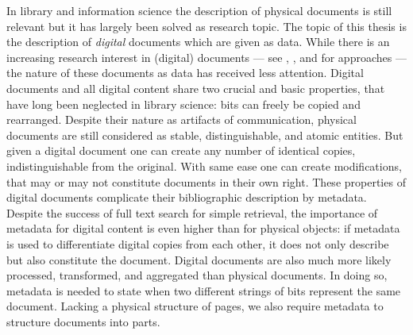 In library and information science the description of physical documents is
still relevant but it has largely been solved as research topic. The topic of
this thesis is the description of \emph{digital} documents which are given as
data.  While there is an increasing research interest in (digital) documents
--- see \textcite{Buckland1998}, \textcite{Pedauque2006}, and
\textcite{Skare2007} for approaches --- the nature of these documents as data
has received less attention. Digital documents and all digital content share
two crucial and basic properties, that have long been neglected in library
science: bits can freely be copied and rearranged.  Despite their nature as
artifacts of communication, physical documents are still considered as stable,
distinguishable, and atomic entities. But given a digital document one can
create any number of identical copies, indistinguishable from the original.
With same ease one can create modifications, that may or may not constitute
documents in their own right. These properties of digital documents complicate
their bibliographic description by metadata. Despite the success of full text
search for simple retrieval, the importance of metadata for digital content is
even higher than for physical objects: if metadata is used to differentiate
digital copies from each other, it does not only describe but also constitute
the document. Digital documents are also much more likely processed,
transformed, and aggregated than physical documents. In doing so, metadata is
needed to state when two different strings of bits represent the same document.
Lacking a physical structure of pages, we also require metadata to structure
documents into parts.

